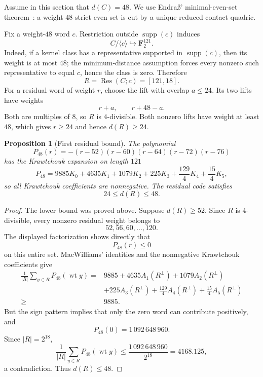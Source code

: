 \documentclass[11pt,reqno]{amsart}
\newtheorem{proposition}[theorem]{Proposition}
\theoremstyle{remark}
\newcommand{\F}{\mathbf F}
\newcommand{\supp}{\operatorname{supp}}
\newcommand{\wt}{\operatorname{wt}}
\newcommand{\Res}{\operatorname{Res}}
\begin{document}
Assume in this section that $d(C)=48$.  We use Endra\ss' minimal-even-set theorem~\cite{EndrassMinimal}: a weight-$48$ strict even set is cut by a unique reduced contact quadric.

Fix a weight-$48$ word $c$.  Restriction outside $\supp(c)$ induces
\[
C/\langle c\rangle\hookrightarrow\F_2^{121}.
\]
Indeed, if a kernel class has a representative supported in $\supp(c)$, then its weight is at most $48$; the minimum-distance assumption forces every nonzero such representative to equal $c$, hence the class is zero.  Therefore
\[
R=\Res(C;c)=[121,18].
\]
For a residual word of weight $r$, choose the lift with overlap $a\le24$.  Its two lifts have weights
\[
r+a,
\qquad
r+48-a.
\]
Both are multiples of $8$, so $R$ is $4$-divisible.  Both nonzero lifts have weight at least $48$, which gives $r\ge24$ and hence $d(R)\ge24$.

\begin{proposition}[First residual bound]\label{prop:w48res}
The polynomial
\[
P_{48}(r)=-(r-52)(r-60)(r-64)(r-72)(r-76)
\]
has the Krawtchouk expansion on length $121$
\[
P_{48}
=9885K_0+4635K_1+1079K_2+225K_3
 +\frac{129}{4}K_4+\frac{15}{4}K_5,
\]
so all Krawtchouk coefficients are nonnegative.  The residual code satisfies
\[
24\le d(R)\le48.
\]
\end{proposition}

\begin{proof}
The lower bound was proved above.  Suppose $d(R)\ge52$.  Since $R$ is $4$-divisible, every nonzero residual weight belongs to
\[
52,56,60,\ldots,120.
\]
The displayed factorization shows directly that
\[
P_{48}(r)\le0
\]
on this entire set.  MacWilliams' identities and the nonnegative Krawtchouk coefficients give
\[
\begin{aligned}
\frac1{|R|}\sum_{y\in R}P_{48}(\wt y)
={}&9885+4635A_1(R^\perp)+1079A_2(R^\perp)\\
&+225A_3(R^\perp)+\frac{129}{4}A_4(R^\perp)
 +\frac{15}{4}A_5(R^\perp)\\
\ge{}&9885.
\end{aligned}
\]
But the sign pattern implies that only the zero word can contribute positively, and
\[
P_{48}(0)=1\,092\,648\,960.
\]
Since $|R|=2^{18}$,
\[
\frac1{|R|}\sum_{y\in R}P_{48}(\wt y)
\le\frac{1\,092\,648\,960}{2^{18}}
=4168.125,
\]
a contradiction.  Thus $d(R)\le48$.
\end{proof}
\end{document}
